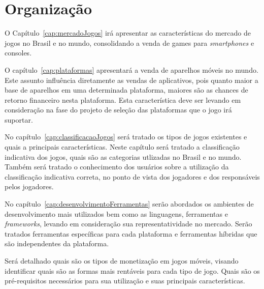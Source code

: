 
\section{Organização}


O Capítulo~\ref{cap:mercadoJogos} irá apresentar as características do mercado de jogos no Brasil e no mundo, consolidando a venda de games para \emph{smartphones} e consoles. 


O capítulo~\ref{cap:plataformas} apresentará a venda de aparelhos móveis no mundo. Este assunto influência diretamente as vendas de aplicativos, pois quanto maior a base de aparelhos em uma determinada plataforma, maiores são as chances de retorno financeiro nesta plataforma. Esta característica deve ser levando em consideração na fase do projeto de seleção das plataformas que o jogo irá suportar.






No capítulo~\ref{cap:classificacaoJogos} será tratado os tipos de jogos existentes e quais a principais características.
Neste capítulo será tratado a classificação indicativa dos jogos, quais são as categorias utlizadas no Brasil e no mundo. Também será tratado o conhecimento dos usuários sobre a utilização da classificação indicativa correta, no ponto de vista dos jogadores e dos responsáveis pelos jogadores.



No capítulo~\ref{cap:desenvolvimentoFerramentas} serão abordados os ambientes de desenvolvimento mais utilizados bem como as linguagens, ferramentas e \emph{frameworks}, levando em consideração sua representatividade no mercado. Serão tratados ferramentas específicas para cada plataforma e ferramentas híbridas que são independentes da plataforma.


Será detalhado quais são os tipos de monetização em jogos móveis, visando identificar quais são as formas mais rentáveis para cada tipo de jogo. Quais são os pré-requisitos necessários para sua utilização e suas principais características.


